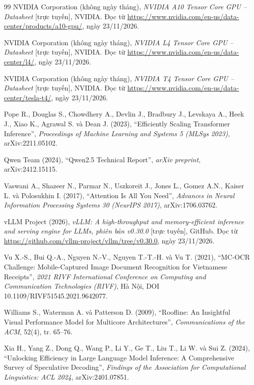 \begin{thebibliography}{99}
NVIDIA Corporation (không ngày tháng), \textit{NVIDIA A10 Tensor Core GPU -- Datasheet}
[trực tuyến], NVIDIA. Đọc từ \url{https://www.nvidia.com/en-us/data-center/products/a10-gpu/},
ngày 23/11/2026.

NVIDIA Corporation (không ngày tháng), \textit{NVIDIA L4 Tensor Core GPU -- Datasheet}
[trực tuyến], NVIDIA. Đọc từ \url{https://www.nvidia.com/en-us/data-center/l4/},
ngày 23/11/2026.

NVIDIA Corporation (không ngày tháng), \textit{NVIDIA T4 Tensor Core GPU -- Datasheet}
[trực tuyến], NVIDIA. Đọc từ \url{https://www.nvidia.com/en-us/data-center/tesla-t4/},
ngày 23/11/2026.

Pope R., Douglas S., Chowdhery A., Devlin J., Bradbury J., Levskaya A., Heek J., Xiao K.,
Agrawal S. và Dean J. (2023),
``Efficiently Scaling Transformer Inference'',
\textit{Proceedings of Machine Learning and Systems 5 (MLSys 2023)}, arXiv:2211.05102.

Qwen Team (2024), ``Qwen2.5 Technical Report'', \textit{arXiv preprint}, arXiv:2412.15115.

Vaswani A., Shazeer N., Parmar N., Uszkoreit J., Jones L., Gomez A.N., Kaiser L. và Polosukhin I. (2017),
``Attention Is All You Need'',
\textit{Advances in Neural Information Processing Systems 30 (NeurIPS 2017)}, arXiv:1706.03762.

vLLM Project (2026), \textit{vLLM: A high-throughput and memory-efficient inference and serving
engine for LLMs, phiên bản v0.30.0} [trực tuyến], GitHub. Đọc từ
\url{https://github.com/vllm-project/vllm/tree/v0.30.0}, ngày 23/11/2026.

Vu X.-S., Bui Q.-A., Nguyen N.-V., Nguyen T.-T.-H. và Vu T. (2021),
``MC-OCR Challenge: Mobile-Captured Image Document Recognition for Vietnamese Receipts'',
\textit{2021 RIVF International Conference on Computing and Communication Technologies (RIVF)},
Hà Nội, DOI 10.1109/RIVF51545.2021.9642077.

Williams S., Waterman A. và Patterson D. (2009),
``Roofline: An Insightful Visual Performance Model for Multicore Architectures'',
\textit{Communications of the ACM}, 52(4), tr. 65--76.

Xia H., Yang Z., Dong Q., Wang P., Li Y., Ge T., Liu T., Li W. và Sui Z. (2024),
``Unlocking Efficiency in Large Language Model Inference: A Comprehensive Survey of
Speculative Decoding'', \textit{Findings of the Association for Computational Linguistics:
ACL 2024}, arXiv:2401.07851.


\end{thebibliography}
